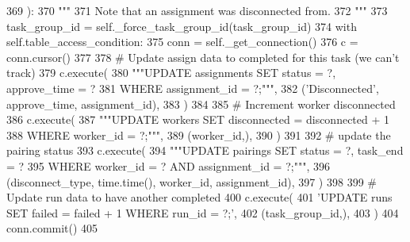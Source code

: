 \begin{DoxyCode}
369     ):
370         \textcolor{stringliteral}{"""}
371 \textcolor{stringliteral}{        Note that an assignment was disconnected from.}
372 \textcolor{stringliteral}{        """}
373         task\_group\_id = self.\_force\_task\_group\_id(task\_group\_id)
374         with self.table\_access\_condition:
375             conn = self.\_get\_connection()
376             c = conn.cursor()
377 
378             \textcolor{comment}{# Update assign data to completed for this task (we can't track)}
379             c.execute(
380                 \textcolor{stringliteral}{"""UPDATE assignments SET status = ?, approve\_time = ?}
381 \textcolor{stringliteral}{                         WHERE assignment\_id = ?;"""},
382                 (\textcolor{stringliteral}{'Disconnected'}, approve\_time, assignment\_id),
383             )
384 
385             \textcolor{comment}{# Increment worker disconnected}
386             c.execute(
387                 \textcolor{stringliteral}{"""UPDATE workers SET disconnected = disconnected + 1}
388 \textcolor{stringliteral}{                         WHERE worker\_id = ?;"""},
389                 (worker\_id,),
390             )
391 
392             \textcolor{comment}{# update the pairing status}
393             c.execute(
394                 \textcolor{stringliteral}{"""UPDATE pairings SET status = ?, task\_end = ?}
395 \textcolor{stringliteral}{                         WHERE worker\_id = ? AND assignment\_id = ?;"""},
396                 (disconnect\_type, time.time(), worker\_id, assignment\_id),
397             )
398 
399             \textcolor{comment}{# Update run data to have another completed}
400             c.execute(
401                 \textcolor{stringliteral}{'UPDATE runs SET failed = failed + 1 WHERE run\_id = ?;'},
402                 (task\_group\_id,),
403             )
404             conn.commit()
405 
\end{DoxyCode}
\mbox{\label{classparlai_1_1mturk_1_1core_1_1legacy__2018_1_1mturk__data__handler_1_1MTurkDataHandler_a8327550db89925461a02490e59e99c76}} 
